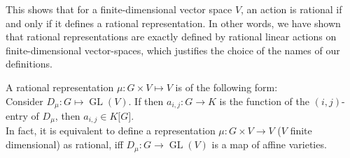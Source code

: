 
\begin{remark}
  This shows that for a finite-dimensional vector space $V$, an action is rational if and only if it defines a rational representation.
  In other words, we have shown that rational representations are exactly defined by rational linear actions on finite-dimensional vector-spaces, which justifies the choice of the names of our definitions.
\end{remark}

\begin{remark}
  A rational representation $\mu \colon G \times V \longmapsto V$ is of the following form:\\
  Consider $D_{\mu} \colon G \longmapsto \operatorname{GL}(V)$.
  If then $ a_{i,j} : G \longrightarrow K $ is the function of the $\left( i,j \right) $-entry of $D_{\mu}$, then $ a_{i,j} \in K\lbrack G\rbrack $.\\
  In fact, it is equivalent to define a representation $\mu \colon G \times V \longrightarrow V$ ($V$ finite dimensional) as rational, iff $D_{\mu} \colon G \longrightarrow \operatorname{GL}(V)$ is a map of affine varieties.
\end{remark}

